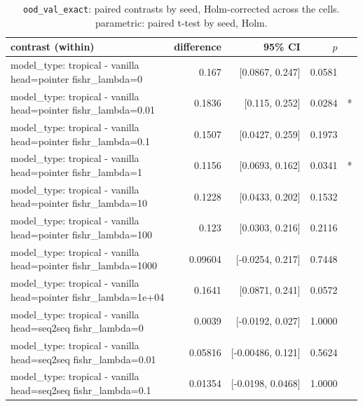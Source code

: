 \documentclass[10pt]{article}
\makeatletter
\newcommand{\stackcell}[1]{\begin{tabular}[t]{@{}l@{}}#1\end{tabular}}
\makeatother
\begin{document}
{\small
\begin{longtable}{lrrrl}
\caption{\texttt{ood\_val\_exact}: paired contrasts by seed, Holm-corrected across the cells. parametric: paired t-test by seed, Holm.}\label{tab:paired-ood_val_exact}\\
\toprule
contrast (within) & difference & 95\% CI & $p$ & \\
\midrule
\endhead
\stackcell{model\_type: tropical - vanilla\\\footnotesize head=pointer fishr\_lambda=0 } & 0.167 & [0.0867, 0.247] & 0.0581 & \\
\stackcell{model\_type: tropical - vanilla\\\footnotesize head=pointer fishr\_lambda=0.01 } & 0.1836 & [0.115, 0.252] & 0.0284 & *\\
\stackcell{model\_type: tropical - vanilla\\\footnotesize head=pointer fishr\_lambda=0.1 } & 0.1507 & [0.0427, 0.259] & 0.1973 & \\
\stackcell{model\_type: tropical - vanilla\\\footnotesize head=pointer fishr\_lambda=1 } & 0.1156 & [0.0693, 0.162] & 0.0341 & *\\
\stackcell{model\_type: tropical - vanilla\\\footnotesize head=pointer fishr\_lambda=10 } & 0.1228 & [0.0433, 0.202] & 0.1532 & \\
\stackcell{model\_type: tropical - vanilla\\\footnotesize head=pointer fishr\_lambda=100 } & 0.123 & [0.0303, 0.216] & 0.2116 & \\
\stackcell{model\_type: tropical - vanilla\\\footnotesize head=pointer fishr\_lambda=1000 } & 0.09604 & [-0.0254, 0.217] & 0.7448 & \\
\stackcell{model\_type: tropical - vanilla\\\footnotesize head=pointer fishr\_lambda=1e+04 } & 0.1641 & [0.0871, 0.241] & 0.0572 & \\
\stackcell{model\_type: tropical - vanilla\\\footnotesize head=seq2seq fishr\_lambda=0 } & 0.0039 & [-0.0192, 0.027] & 1.0000 & \\
\stackcell{model\_type: tropical - vanilla\\\footnotesize head=seq2seq fishr\_lambda=0.01 } & 0.05816 & [-0.00486, 0.121] & 0.5624 & \\
\stackcell{model\_type: tropical - vanilla\\\footnotesize head=seq2seq fishr\_lambda=0.1 } & 0.01354 & [-0.0198, 0.0468] & 1.0000 & \\

\end{longtable}}
\end{document}
